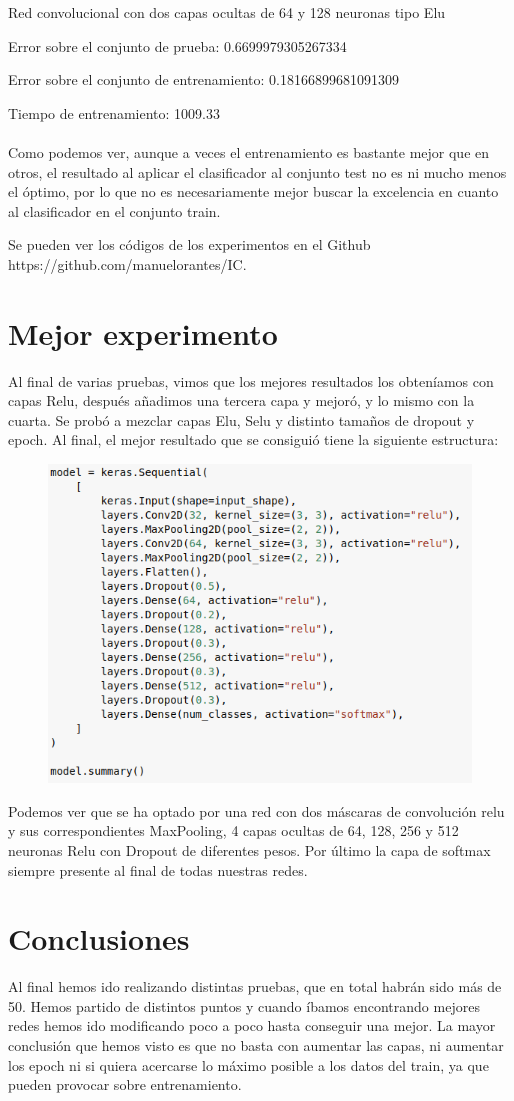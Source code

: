 Red convolucional con dos capas ocultas de 64 y 128 neuronas tipo Elu

Error sobre el conjunto de prueba: 0.6699979305267334

Error sobre el conjunto de entrenamiento: 0.18166899681091309

Tiempo de entrenamiento: 1009.33
\\\\
Como podemos ver, aunque a veces el entrenamiento es bastante mejor que en otros, el resultado al aplicar el clasificador al conjunto test no es ni mucho menos el óptimo, por lo que no es necesariamente mejor buscar la excelencia en cuanto al clasificador en el conjunto train.

Se pueden ver los códigos de los experimentos en el Github https://github.com/manuelorantes/IC.

\section{Mejor experimento}

Al final de varias pruebas, vimos que los mejores resultados los obteníamos con capas Relu, después añadimos una tercera capa y mejoró, y lo mismo con la cuarta. Se probó a mezclar capas Elu, Selu y distinto tamaños de dropout y epoch. Al final, el mejor resultado que se consiguió tiene la siguiente estructura:

\begin{figure}[H]
	\centering
	\includegraphics[width=0.7\linewidth]{mejor}
	\label{fig:mejor}
\end{figure}
\newpage
Podemos ver que se ha optado por una red con dos máscaras de convolución relu y sus correspondientes MaxPooling, 4 capas ocultas de 64, 128, 256 y 512 neuronas Relu con Dropout de diferentes pesos. Por último la capa de softmax siempre presente al final de todas nuestras redes.


\section{Conclusiones}
Al final hemos ido realizando distintas pruebas, que en total habrán sido más de 50. Hemos partido de distintos puntos y cuando íbamos encontrando mejores redes hemos ido modificando poco a poco hasta conseguir una mejor. La mayor conclusión que hemos visto es que no basta con aumentar las capas, ni aumentar los epoch ni si quiera acercarse lo máximo posible a los datos del train, ya que pueden provocar sobre entrenamiento.

